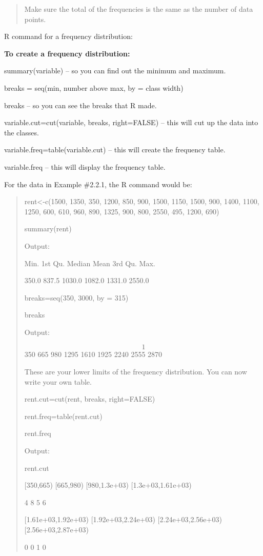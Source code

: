 \documentclass[]{book}
\begin{document}
\begin{quote}
Make sure the total of the frequencies is the same as the number of
data points.
\end{quote}

R command for a frequency distribution:

\textbf{To create a frequency distribution:}

summary(variable) -- so you can find out the minimum and maximum.

breaks = seq(min, number above max, by = class width)

breaks -- so you can see the breaks that R made.

variable.cut=cut(variable, breaks, right=FALSE) -- this will cut up the
data into the classes.

variable.freq=table(variable.cut) -- this will create the frequency
table.

variable.freq -- this will display the frequency table.

For the data in Example \#2.2.1, the R command would be:

\begin{quote}
rent\textless{}-c(1500, 1350, 350, 1200, 850, 900, 1500, 1150, 1500, 900, 1400,
1100, 1250, 600, 610, 960, 890, 1325, 900, 800, 2550, 495, 1200, 690)

summary(rent)

Output:

Min. 1st Qu. Median Mean 3rd Qu. Max.

350.0 837.5 1030.0 1082.0 1331.0 2550.0

breaks=seq(350, 3000, by = 315)

breaks

Output:

\[1\] 350 665 980 1295 1610 1925 2240 2555 2870

These are your lower limits of the frequency distribution. You can now
write your own table.

rent.cut=cut(rent, breaks, right=FALSE)

rent.freq=table(rent.cut)

rent.freq

Output:

rent.cut

{[}350,665) {[}665,980) {[}980,1.3e+03) {[}1.3e+03,1.61e+03)

4 8 5 6

{[}1.61e+03,1.92e+03) {[}1.92e+03,2.24e+03) {[}2.24e+03,2.56e+03)
{[}2.56e+03,2.87e+03)

0 0 1 0
\end{quote}
\end{document}
